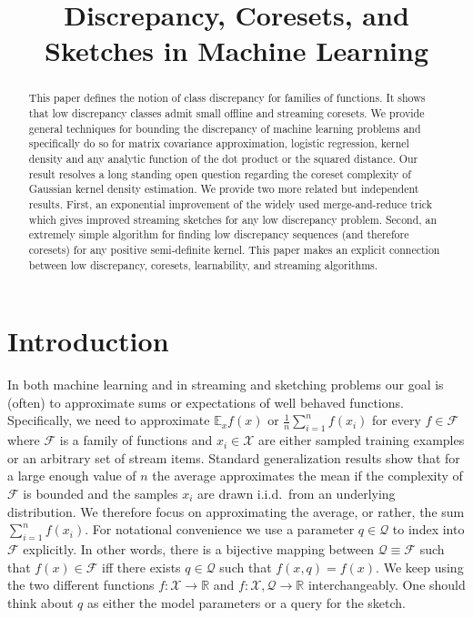 \documentclass[anon,12pt]{colt2019} %
\title[Discrepancy, Coresets, and Sketches in Machine Learning]{Discrepancy, Coresets, and Sketches in Machine Learning}
\newcommand{\R}{\mathbb{R}}
\newcommand{\E}{\mathbb{E}}
\newcommand{\F}{\mathcal{F}}
\newcommand{\X}{\mathcal{X}}
\newcommand{\Q}{\mathcal{Q}}
\begin{document}
\maketitle

\begin{abstract}
This paper defines the notion of class discrepancy for families of functions.  It shows that low discrepancy classes admit small offline and streaming coresets. We provide general techniques for bounding the discrepancy of machine learning problems and specifically do so for matrix covariance approximation, logistic regression, kernel density and any analytic function of the dot product or the squared distance.
Our result resolves a long standing open question regarding the coreset complexity of Gaussian kernel density estimation.  
We provide two more related but independent results. 
First, an exponential improvement of the widely used merge-and-reduce trick which gives improved streaming sketches for any low discrepancy problem.
Second, an extremely simple algorithm for finding low discrepancy sequences (and therefore coresets) for any positive semi-definite kernel. 
This paper makes an explicit connection between low discrepancy, coresets, learnability, and streaming algorithms. 
\end{abstract}


\section{Introduction}
In both machine learning and in streaming and sketching problems our goal is (often) to approximate sums or expectations of well behaved functions.
Specifically, we need to approximate $\E_x f(x)$ or $\frac{1}{n}\sum_{i=1}^{n} f(x_i)$ for every $f\in \F$ where $\F$ is a family of functions and $x_i \in \X$ are either sampled training examples or an arbitrary set of stream items. 
Standard generalization results show that for a large enough value of $n$ the average approximates the mean if the complexity of $\F$ is bounded and the samples $x_i$ are drawn i.i.d.\ from an underlying distribution. We therefore focus on approximating the average, or rather, the sum $\sum_{i=1}^{n} f(x_i)$. For notational convenience we use a parameter $q \in \Q$ to index into $\F$ explicitly. 
In other words, there is a bijective mapping between $\Q \equiv \F$ such that $f(x) \in \F$ iff there exists $q\in\Q$ such that $f(x,q)=f(x)$.
We keep using the two different functions $f:\X\rightarrow\R$ and $f:\X,\Q\rightarrow\R$ interchangeably. 
One should think about $q$ as either the model parameters or a query for the sketch. 
\end{document}
